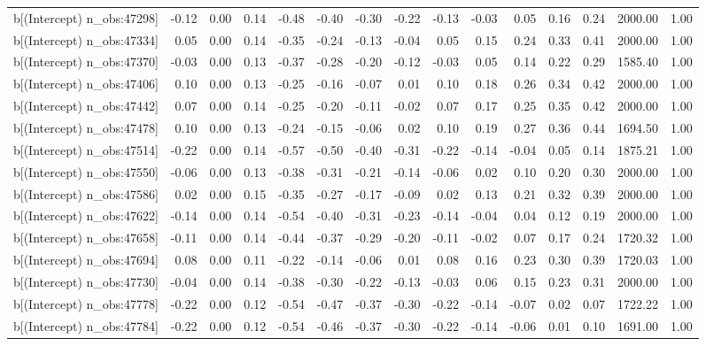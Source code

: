 \begin{table}[ht]
\begin{tabular}{rrrrrrrrrrrrrrr}
  b[(Intercept) n\_obs:47298] & -0.12 & 0.00 & 0.14 & -0.48 & -0.40 & -0.30 & -0.22 & -0.13 & -0.03 & 0.05 & 0.16 & 0.24 & 2000.00 & 1.00 \\ 
  b[(Intercept) n\_obs:47334] & 0.05 & 0.00 & 0.14 & -0.35 & -0.24 & -0.13 & -0.04 & 0.05 & 0.15 & 0.24 & 0.33 & 0.41 & 2000.00 & 1.00 \\ 
  b[(Intercept) n\_obs:47370] & -0.03 & 0.00 & 0.13 & -0.37 & -0.28 & -0.20 & -0.12 & -0.03 & 0.05 & 0.14 & 0.22 & 0.29 & 1585.40 & 1.00 \\ 
  b[(Intercept) n\_obs:47406] & 0.10 & 0.00 & 0.13 & -0.25 & -0.16 & -0.07 & 0.01 & 0.10 & 0.18 & 0.26 & 0.34 & 0.42 & 2000.00 & 1.00 \\ 
  b[(Intercept) n\_obs:47442] & 0.07 & 0.00 & 0.14 & -0.25 & -0.20 & -0.11 & -0.02 & 0.07 & 0.17 & 0.25 & 0.35 & 0.42 & 2000.00 & 1.00 \\ 
  b[(Intercept) n\_obs:47478] & 0.10 & 0.00 & 0.13 & -0.24 & -0.15 & -0.06 & 0.02 & 0.10 & 0.19 & 0.27 & 0.36 & 0.44 & 1694.50 & 1.00 \\ 
  b[(Intercept) n\_obs:47514] & -0.22 & 0.00 & 0.14 & -0.57 & -0.50 & -0.40 & -0.31 & -0.22 & -0.14 & -0.04 & 0.05 & 0.14 & 1875.21 & 1.00 \\ 
  b[(Intercept) n\_obs:47550] & -0.06 & 0.00 & 0.13 & -0.38 & -0.31 & -0.21 & -0.14 & -0.06 & 0.02 & 0.10 & 0.20 & 0.30 & 2000.00 & 1.00 \\ 
  b[(Intercept) n\_obs:47586] & 0.02 & 0.00 & 0.15 & -0.35 & -0.27 & -0.17 & -0.09 & 0.02 & 0.13 & 0.21 & 0.32 & 0.39 & 2000.00 & 1.00 \\ 
  b[(Intercept) n\_obs:47622] & -0.14 & 0.00 & 0.14 & -0.54 & -0.40 & -0.31 & -0.23 & -0.14 & -0.04 & 0.04 & 0.12 & 0.19 & 2000.00 & 1.00 \\ 
  b[(Intercept) n\_obs:47658] & -0.11 & 0.00 & 0.14 & -0.44 & -0.37 & -0.29 & -0.20 & -0.11 & -0.02 & 0.07 & 0.17 & 0.24 & 1720.32 & 1.00 \\ 
  b[(Intercept) n\_obs:47694] & 0.08 & 0.00 & 0.11 & -0.22 & -0.14 & -0.06 & 0.01 & 0.08 & 0.16 & 0.23 & 0.30 & 0.39 & 1720.03 & 1.00 \\ 
  b[(Intercept) n\_obs:47730] & -0.04 & 0.00 & 0.14 & -0.38 & -0.30 & -0.22 & -0.13 & -0.03 & 0.06 & 0.15 & 0.23 & 0.31 & 2000.00 & 1.00 \\ 
  b[(Intercept) n\_obs:47778] & -0.22 & 0.00 & 0.12 & -0.54 & -0.47 & -0.37 & -0.30 & -0.22 & -0.14 & -0.07 & 0.02 & 0.07 & 1722.22 & 1.00 \\ 
  b[(Intercept) n\_obs:47784] & -0.22 & 0.00 & 0.12 & -0.54 & -0.46 & -0.37 & -0.30 & -0.22 & -0.14 & -0.06 & 0.01 & 0.10 & 1691.00 & 1.00 \\ 

\end{tabular}
\end{table}
